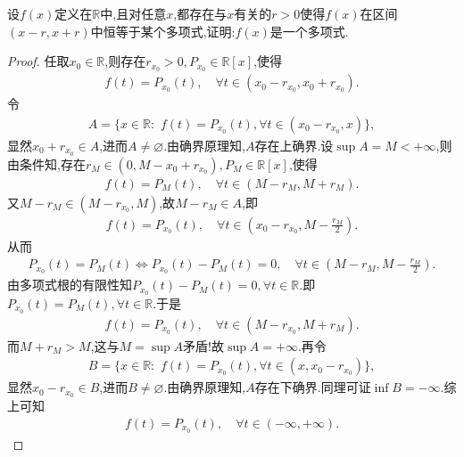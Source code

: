 \documentclass[../../main.tex]{subfiles}%
\begin{document}
\begin{example}
设$f(x)$定义在$\mathbb{R}$中,且对任意$x$,都存在与$x$有关的$r>0$使得$f(x)$在区间$(x-r,x+r)$中恒等于某个多项式,证明:$f(x)$是一个多项式.
\end{example}
\begin{proof}

任取$x_0\in \mathbb{R}$,则存在$r_{x_0}>0,P_{x_0}\in \mathbb{R}[x]$,使得
\begin{align*}
f(t)=P_{x_0}(t),\quad \forall t\in (x_0-r_{x_0},x_0+r_{x_0}).
\end{align*}
令
\begin{align*}
A=\{x\in \mathbb{R}:\,\,f(t)=P_{x_0}(t),\forall t\in (x_0-r_{x_0},x)\},
\end{align*}
显然$x_0+r_{x_0}\in A$,进而$A\ne \varnothing$.由确界原理知,$A$存在上确界.设$\sup A=M<+\infty$,则由条件知,存在$r_M\in (0,M-x_0+r_{x_0}),P_M\in \mathbb{R}[x]$,使得
\begin{align*}
f(t)=P_M(t),\quad \forall t\in (M-r_M,M+r_M).
\end{align*}
又$M-r_M\in (M-r_{x_0},M)$,故$M-r_M\in A$,即
\begin{align*}
f(t)=P_{x_0}(t),\quad \forall t\in (x_0-r_{x_0},M-\frac{r_M}{2}).
\end{align*}
从而
\begin{align*}
P_{x_0}(t)=P_M(t)\Longleftrightarrow P_{x_0}(t)-P_M(t)=0,\quad \forall t\in (M-r_M,M-\frac{r_M}{2}).
\end{align*}
由多项式根的有限性知$P_{x_0}(t)-P_M(t)=0,\forall t\in \mathbb{R}$.即$P_{x_0}(t)=P_M(t),\forall t\in \mathbb{R}$.于是
\begin{align*}
f(t)=P_{x_0}(t),\quad \forall t\in (M-r_{x_0},M+r_M).
\end{align*}
而$M+r_M>M$,这与$M=\sup A$矛盾!故$\sup A=+\infty$.再令
\begin{align*}
B=\{x\in \mathbb{R}:\,\,f(t)=P_{x_0}(t),\forall t\in (x,x_0-r_{x_0})\},
\end{align*}
显然$x_0-r_{x_0}\in B$,进而$B\ne \varnothing$.由确界原理知,$A$存在下确界.同理可证$\inf B=-\infty$.综上可知
\begin{align*}
f(t)=P_{x_0}(t),\quad \forall t\in (-\infty,+\infty).
\end{align*}

\end{proof}
\end{document}
